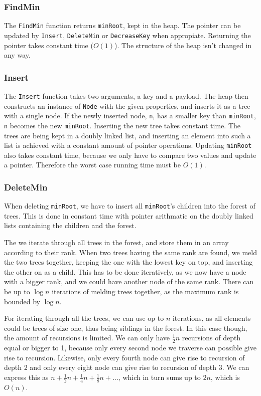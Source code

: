 \documentclass[a4paper,10pt]{article}
\begin{document}
\subsubsection*{FindMin}
The \texttt{FindMin} function returns \texttt{minRoot}, kept in the heap. The pointer can be updated by \texttt{Insert}, \texttt{DeleteMin} or \texttt{DecreaseKey} when appropiate. Returning the pointer takes constant time ($O(1)$). The structure of the heap isn't changed in any way.
\subsubsection*{Insert}
The \texttt{Insert} function takes two arguments, a key and a payload. The heap then constructs an instance of \texttt{Node} with the given properties, and inserts it as a tree with a single node. If the newly inserted node, \texttt{n}, has a smaller key than \texttt{minRoot}, \texttt{n} becomes the new \texttt{minRoot}.
Inserting the new tree takes constant time. The trees are being kept in a doubly linked list, and inserting an element into such a list is achieved with a constant amount of pointer operations. Updating \texttt{minRoot} also takes constant time, because we only have to compare two values and update a pointer. Therefore the worst case running time must be $O(1)$.
\subsubsection*{DeleteMin}
When deleting \texttt{minRoot}, we have to insert all \texttt{minRoot}'s children into the forest of trees. This is done in constant time with pointer arithmatic on the doubly linked lists containing the children and the forest.

The we iterate through all trees in the forest, and store them in an array according to their rank. When two trees having the same rank are found, we meld the two trees together, keeping the one with the lowest key on top, and inserting the other on as a child. This has to be done iteratively, as we now have a node with a bigger rank, and we could have another node of the same rank. There can be up to $\log n$ iterations of melding trees together, as the maximum rank is bounded by $\log n$.

For iterating through all the trees, we can use op to $n$ iterations, as all elements could be trees of size one, thus being siblings in the forest. In this case though, the amount of recursions is limited. We can only have $\frac{1}{2} n$ recursions of depth equal or bigger to 1, because only every second node we traverse can possible give rise to recursion. Likewise, only every fourth node can give rise to recursion of depth 2 and only every eight node can give rise to recursion of depth 3. We can express this as $n + \frac{1}{2}n + \frac{1}{4}n + \frac{1}{8}n + ...$, which in turn sums up to $2n$, which is $O(n)$.
\end{document}
